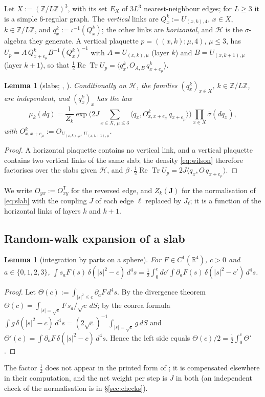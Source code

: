 \documentclass[11pt,a4paper]{article}
\theoremstyle{plain}
\newtheorem{lemma}[theorem]{Lemma}
\theoremstyle{remark}
\numberwithin{equation}{section}
\newcommand{\R}{\mathbb{R}}
\newcommand{\Z}{\mathbb{Z}}
\newcommand{\ReTr}{\operatorname{Re}\operatorname{Tr}}
\newcommand{\cH}{\mathcal{H}}
\newcommand{\bs}{\boldsymbol}
\begin{document}
Let $X:=(\Z/L\Z)^3$, with its set $E_X$ of $3L^3$ nearest-neighbour edges; for $L\ge3$ it is a simple $6$-regular graph. The
\emph{vertical} links are $Q^k_x:=U_{(x,k),4}$, $x\in X$, $k\in\Z/L\Z$, and $q^k_x:=\iota^{-1}(Q^k_x)$; the other links are
\emph{horizontal}, and $\cH$ is the $\sigma$-algebra they generate. A vertical plaquette $p=((x,k);\mu,4)$, $\mu\le3$, has
$U_p=A\,Q^k_{x+e_\mu}B^{-1}(Q^k_x)^{-1}$ with $A=U_{(x,k),\mu}$ (layer $k$) and $B=U_{(x,k+1),\mu}$ (layer $k+1$), so that
$\frac12\ReTr U_p=\langle q^k_x,O_{A,B}\,q^k_{x+e_\mu}\rangle$.

\begin{lemma}[slabs; {\cite[(1.17)--(1.19)]{DF80}}, {\cite[Lemma~7.4]{D7}}]\label{lem:slab}
Conditionally on $\cH$, the families $(q^k_x)_{x\in X}$, $k\in\Z/L\Z$, are independent, and $(q^k_x)_x$ has the law
\begin{equation}\label{eq:slab}
\mu_k(dq)=\frac1{Z_k}\exp\Big(2J\sum_{x\in X,\,\mu\le3}\langle q_x,O^k_{x,x+e_\mu}\,q_{x+e_\mu}\rangle\Big)\prod_{x\in X}\bar\sigma(dq_x),
\end{equation}
with $O^k_{x,x+e_\mu}:=O_{U_{(x,k),\mu},\,U_{(x,k+1),\mu}}$.
\end{lemma}
\begin{proof}
A horizontal plaquette contains no vertical link, and a vertical plaquette contains two vertical links of the same slab; the density
\eqref{eq:wilson} therefore factorises over the slabs given $\cH$, and $\beta\cdot\frac12\ReTr U_p=2J\langle q_x,O\,q_{x+e_\mu}\rangle$.
\end{proof}
\noindent We write $O_{yx}:=O_{xy}^{\mathsf T}$ for the reversed edge, and $Z_k(\bs J)$ for the normalisation of \eqref{eq:slab} with
the coupling $J$ of each edge $\ell$ replaced by $J_\ell$; it is a function of the horizontal links of layers $k$ and $k+1$.

\subsection{Random-walk expansion of a slab}
\begin{lemma}[integration by parts on a sphere]\label{lem:ipp}
For $F\in C^1(\R^4)$, $c>0$ and $a\in\{0,1,2,3\}$,
$\displaystyle\int s_aF(s)\,\delta(|s|^2-c)\,d^4s=\frac12\int_0^c dc'\int\partial_aF(s)\,\delta(|s|^2-c')\,d^4s$.
\end{lemma}
\begin{proof}
Let $\Theta(c):=\int_{|s|^2\le c}\partial_aF\,d^4s$. By the divergence theorem $\Theta(c)=\int_{|s|=\sqrt c}F\,s_a/\sqrt c\,dS$; by the
coarea formula $\int g\,\delta(|s|^2-c)\,d^4s=(2\sqrt c)^{-1}\int_{|s|=\sqrt c}g\,dS$ and $\Theta'(c)=\int\partial_aF\,\delta(|s|^2-c)\,
d^4s$. Hence the left side equals $\Theta(c)/2=\frac12\int_0^c\Theta'$.
\end{proof}
\noindent The factor $\frac12$ does not appear in the printed form of \cite[Lemma~B.1(i), p.~374]{BS83}; it is compensated elsewhere in their
computation, and the net weight per step is $J$ in both (an independent check of the normalisation is in \S\ref{sec:checks}).
\end{document}
